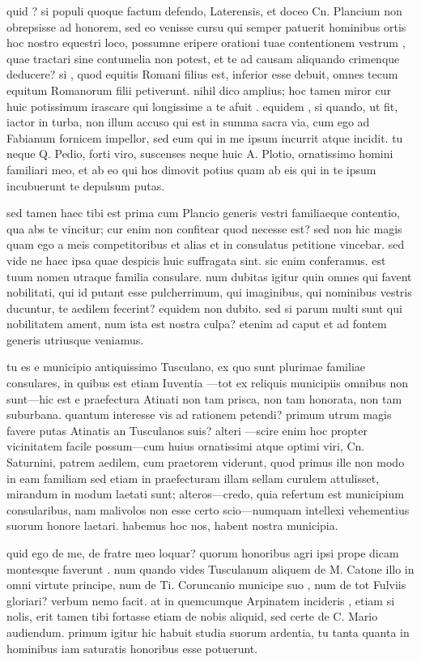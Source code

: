  quid ? si populi quoque factum defendo, Laterensis, et doceo Cn. Plancium non obrepsisse ad honorem, sed eo venisse cursu qui semper patuerit hominibus ortis hoc nostro equestri loco, possumne eripere orationi tuae contentionem vestrum , quae tractari sine contumelia non potest, et te ad causam aliquando crimenque deducere? si , quod equitis Romani filius est, inferior esse debuit, omnes tecum equitum Romanorum filii petiverunt. nihil dico amplius; hoc tamen miror cur huic potissimum irascare qui longissime a te afuit . equidem , si quando, ut fit, iactor in turba, non illum accuso qui est in summa sacra via, cum ego ad Fabianum fornicem impellor, sed eum qui in me ipsum incurrit atque incidit. tu neque Q. Pedio, forti viro, suscenses neque huic A. Plotio, ornatissimo homini familiari meo, et ab eo qui hos dimovit potius quam ab eis qui in te ipsum incubuerunt te depulsum putas.

 sed tamen haec tibi est prima cum Plancio generis vestri familiaeque contentio, qua abs te vincitur; cur enim non confitear quod necesse est? sed non hic magis quam ego a meis competitoribus et alias et in consulatus petitione vincebar. sed vide ne haec ipsa quae despicis huic suffragata sint. sic enim conferamus. est tuum nomen utraque familia consulare. num dubitas igitur quin omnes qui favent nobilitati, qui id putant esse pulcherrimum, qui imaginibus, qui nominibus vestris ducuntur, te aedilem fecerint? equidem non dubito. sed si parum multi sunt qui nobilitatem ament, num ista est nostra culpa? etenim ad caput et ad fontem generis utriusque veniamus.

 tu es e municipio antiquissimo Tusculano, ex quo sunt plurimae familiae consulares, in quibus est etiam Iuventia —tot ex reliquis municipiis omnibus non sunt—hic est e praefectura Atinati non tam prisca, non tam honorata, non tam suburbana. quantum interesse vis ad rationem petendi? primum utrum magis favere putas Atinatis an Tusculanos suis? alteri —scire enim hoc propter vicinitatem facile possum—cum huius ornatissimi atque optimi viri, Cn. Saturnini, patrem aedilem, cum praetorem viderunt, quod primus ille non modo in eam familiam sed etiam in praefecturam illam sellam curulem attulisset, mirandum in modum laetati sunt; alteros—credo, quia refertum est municipium consularibus, nam malivolos non esse certo scio—numquam intellexi vehementius suorum honore laetari. habemus hoc nos, habent nostra municipia.

 quid ego de me, de fratre meo loquar? quorum honoribus agri ipsi prope dicam montesque faverunt . num quando vides Tusculanum aliquem de M. Catone illo in omni virtute principe, num de Ti. Coruncanio municipe suo , num de tot Fulviis gloriari? verbum nemo facit. at in quemcumque Arpinatem incideris , etiam si nolis, erit tamen tibi fortasse etiam de nobis aliquid, sed certe de C. Mario audiendum. primum igitur hic habuit studia suorum ardentia, tu tanta quanta in hominibus iam saturatis honoribus esse potuerunt.

